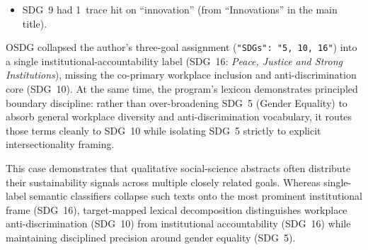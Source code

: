 \begin{casestudySection}
\begin{itemize}
    \item \gls{SDG}~9 had \num{1}~trace hit on \enquote{innovation} (from \enquote{Innovations} in the main title).
\end{itemize}

OSDG collapsed the author's three-goal assignment (\texttt{"SDGs": "5, 10, 16"}) into a single institutional-accountability label (\gls{SDG}~16: \textit{Peace, Justice and Strong Institutions}), missing the co-primary workplace inclusion and anti-discrimination core (\gls{SDG}~10). At the same time, the program's lexicon demonstrates principled boundary discipline: rather than over-broadening \gls{SDG}~5 (Gender Equality) to absorb general workplace diversity and anti-discrimination vocabulary, it routes those terms cleanly to \gls{SDG}~10 while isolating \gls{SDG}~5 strictly to explicit intersectionality framing.
\end{casestudySection}

\begin{takeaway}
This case demonstrates that qualitative social-science abstracts often distribute their sustainability signals across multiple closely related goals. Whereas single-label semantic classifiers collapse such texts onto the most prominent institutional frame (\gls{SDG}~16), target-mapped lexical decomposition distinguishes workplace anti-discrimination (\gls{SDG}~10) from institutional accountability (\gls{SDG}~16) while maintaining disciplined precision around gender equality (\gls{SDG}~5).
\end{takeaway}

